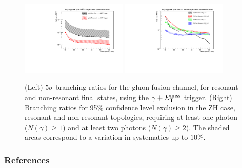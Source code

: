 \begin{figure}[htbp]
\centering
\includegraphics[width=0.45\textwidth]{finalresults/branchingratio_ggh.pdf}
\includegraphics[width=0.45\textwidth]{finalresults/exclusion_zh.pdf}
\caption{(Left) $5\sigma$ branching ratios for the gluon fusion channel, for resonant and non-resonant final states, using the $\gamma+E_{\mathrm{T}}^{\text{miss}}$ trigger. (Right) Branching ratios for 95$\%$ confidence level exclusion in the ZH case, resonant and non-resonant topologies, requiring at least one photon ($N(\gamma) \geq 1$) and at least two photons ($N(\gamma) \geq 2$). The shaded areas correspond to a variation in systematics up to $10\%$.}
\label{fig:branching_5sigma}
\end{figure}
	\clearpage
	\newpage
\subsubsection*{References}
\vspace{-5ex}

